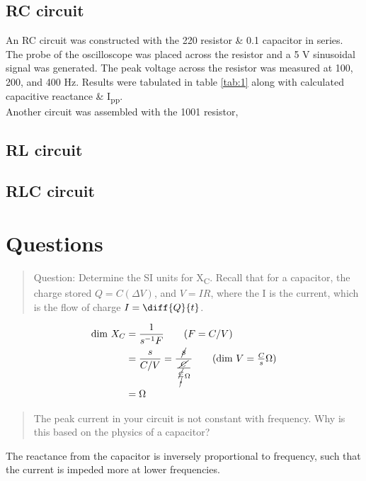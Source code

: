 \documentclass{article}
\begin{document}
		\subsection{RC circuit}
			An RC circuit was constructed with the 220 \textOmega{} resistor \& 0.1 \textOmega{} capacitor in series. The probe of the oscilloscope was placed across the resistor and a 5 V sinusoidal signal was generated. The peak voltage across the resistor was measured at 100, 200, and 400 Hz. Results were tabulated in table \ref{tab:1} along with calculated capacitive reactance \& I\textsubscript{pp}.\\
			Another circuit was assembled with the 1001 \textOmega{} resistor,

		\subsection{RL circuit}
		
		\subsection{RLC circuit}

		
	\section{}

	\section{Questions}
		\begin{quotation}
			Question: Determine the SI units for X\textsubscript{C}. Recall that for a capacitor, the charge stored $Q = C(\Delta V)$, and $V = IR$, where the I is the current, which is the flow of charge $I = \diff{Q}{t}$.
		\end{quotation}
		\begin{align*}
			\text{dim } X_C &= \frac{1}{s^{-1} F} \tag{$F = C/V$}\\
			&= \frac{s}{C/V} = \frac{\cancel{s}}{\frac{\cancel{C}}{\frac{\cancel{C}}{\cancel{s}} \Omega}} \tag{$\text{dim }V = \frac{C}{s} \Omega$}\\
			&= \Omega
		\end{align*}
		
		\begin{quotation}
			The peak current in your circuit is not constant with frequency. Why is this based on the physics of a capacitor?
		\end{quotation}
		The reactance from the capacitor is inversely proportional to frequency, such that the current is impeded more at lower frequencies.
\end{document}
